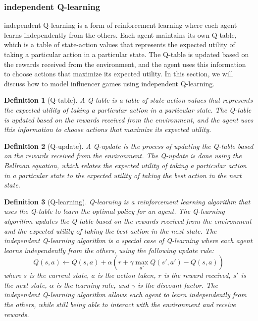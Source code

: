 \documentclass{article}
\newtheorem{definition}{Definition}
\begin{document}
        \subsubsection{independent Q-learning}
            independent Q-learning is a form of reinforcement learning where each agent learns independently from the others. Each agent maintains its own Q-table, which is a table of state-action values that represents the expected utility of taking a particular action in a particular state. The Q-table is updated based on the rewards received from the environment, and the agent uses this information to choose actions that maximize its expected utility. In this section, we will discuss how to model influencer games using independent Q-learning.
            \begin{definition}[Q-table]
                A Q-table is a table of state-action values that represents the expected utility of taking a particular action in a particular state. The Q-table is updated based on the rewards received from the environment, and the agent uses this information to choose actions that maximize its expected utility.
            \end{definition}
            \begin{definition}[Q-update] 
                A Q-update is the process of updating the Q-table based on the rewards received from the environment. The Q-update is done using the Bellman equation, which relates the expected utility of taking a particular action in a particular state to the expected utility of taking the best action in the next state.
            \end{definition}
            \begin{definition}[Q-learning]
                Q-learning is a reinforcement learning algorithm that uses the Q-table to learn the optimal policy for an agent. The Q-learning algorithm updates the Q-table based on the rewards received from the environment and the expected utility of taking the best action in the next state. The independent Q-learning algorithm is a special case of Q-learning where each agent learns independently from the others, using the following update rule:
                \begin{equation}
                    Q(s,a) \leftarrow Q(s,a) + \alpha \left( r + \gamma \max_{a'} Q(s',a') - Q(s,a) \right)
                \end{equation}
                where $s$ is the current state, $a$ is the action taken, $r$ is the reward received, $s'$ is the next state, $\alpha$ is the learning rate, and $\gamma$ is the discount factor. The independent Q-learning algorithm allows each agent to learn independently from the others, while still being able to interact with the environment and receive rewards.
            \end{definition}
\end{document}
